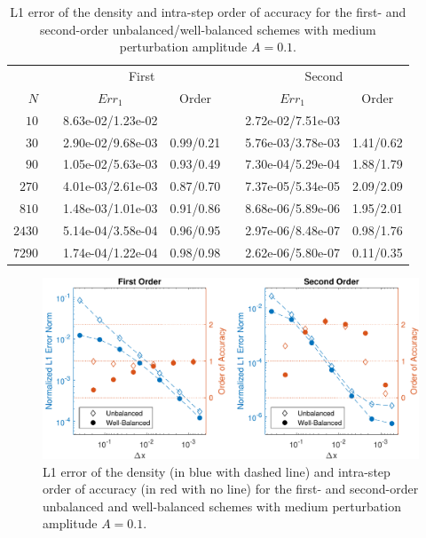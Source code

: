 \begin{table}\centering
\caption{L1 error of the density and intra-step order of accuracy for the first- and second-order unbalanced/well-balanced schemes with medium perturbation amplitude $A=0.1$.}
\label{table:OVS_Amedium}
\begin{tabular}{@{}rcccccc@{}}\toprule
& \phantom{a} & \multicolumn{2}{c}{First} & \phantom{ab} & \multicolumn{2}{c}{Second}\\
\cmidrule{3-4} \cmidrule{6-7}
$N$ && $Err_1$ & Order && $Err_1$ & Order\\ \midrule
$10$ && 8.63e-02/1.23e-02 &&& 2.72e-02/7.51e-03 &\\
$30$ && 2.90e-02/9.68e-03 & 0.99/0.21 && 5.76e-03/3.78e-03 & 1.41/0.62\\
$90$ && 1.05e-02/5.63e-03 & 0.93/0.49 && 7.30e-04/5.29e-04 & 1.88/1.79\\
$270$ && 4.01e-03/2.61e-03 & 0.87/0.70 && 7.37e-05/5.34e-05 & 2.09/2.09\\
$810$ && 1.48e-03/1.01e-03 & 0.91/0.86 && 8.68e-06/5.89e-06 & 1.95/2.01\\
$2430$ && 5.14e-04/3.58e-04 & 0.96/0.95 && 2.97e-06/8.48e-07 & 0.98/1.76\\
$7290$ && 1.74e-04/1.22e-04 & 0.98/0.98 && 2.62e-06/5.80e-07 & 0.11/0.35\\
\bottomrule
\end{tabular}
\end{table}

\begin {figure}
\centering
\includegraphics[width=13cm]{figures/OVSeps0_1}
\caption {L1 error of the density (in blue with dashed line) and intra-step order of accuracy (in red with no line) for the first- and second-order unbalanced and well-balanced schemes with medium perturbation amplitude $A=0.1$.}
\label{fig:OVS_Amedium}
\end{figure}

